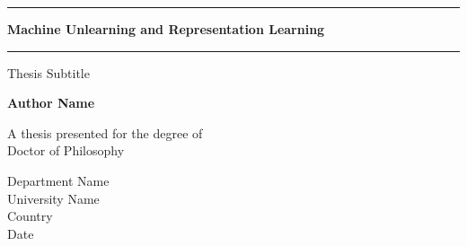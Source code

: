 








\begin{titlepage}
 \BgThispage
   \begin{center}
       \vspace*{1cm}


        \noindent\rule{14cm}{0.6pt}
        
        \vspace{10pt}

        {\Large 
       \textbf{Machine Unlearning and Representation Learning}
        }
    
        \vspace{10pt}

        \noindent\rule{14cm}{0.6pt}

       \vspace{0.5cm}
        Thesis Subtitle
            
       \vspace{1.5cm}

       \textbf{Author Name}

       \vfill
            
       A thesis presented for the degree of\\
       Doctor of Philosophy
            
       \vspace{0.8cm}
     
            
       Department Name\\
       University Name\\
       Country\\
       Date
            
   \end{center}
\end{titlepage}